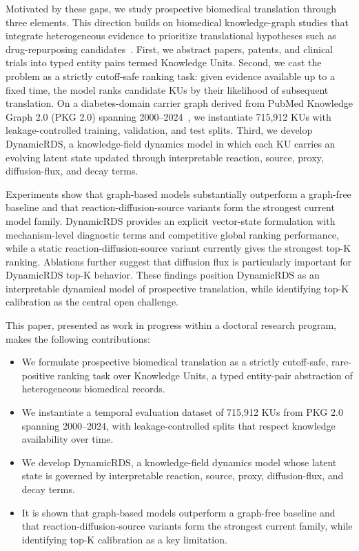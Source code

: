 \documentclass[conference]{IEEEtran}
\begin{document}
Motivated by these gaps, we study prospective biomedical translation through three elements. This direction builds on biomedical knowledge-graph studies that integrate heterogeneous evidence to prioritize translational hypotheses such as drug-repurposing candidates~\cite{himmelstein2017systematic}. First, we abstract papers, patents, and clinical trials into typed entity pairs termed Knowledge Units. Second, we cast the problem as a strictly cutoff-safe ranking task: given evidence available up to a fixed time, the model ranks candidate KUs by their likelihood of subsequent translation. On a diabetes-domain carrier graph derived from PubMed Knowledge Graph 2.0 (PKG 2.0) spanning 2000--2024~\cite{xu2024pubmed}, we instantiate 715,912 KUs with leakage-controlled training, validation, and test splits. Third, we develop DynamicRDS, a knowledge-field dynamics model in which each KU carries an evolving latent state updated through interpretable reaction, source, proxy, diffusion-flux, and decay terms.

Experiments show that graph-based models substantially outperform a graph-free baseline and that reaction-diffusion-source variants form the strongest current model family. DynamicRDS provides an explicit vector-state formulation with mechanism-level diagnostic terms and competitive global ranking performance, while a static reaction-diffusion-source variant currently gives the strongest top-K ranking. Ablations further suggest that diffusion flux is particularly important for DynamicRDS top-K behavior. These findings position DynamicRDS as an interpretable dynamical model of prospective translation, while identifying top-K calibration as the central open challenge.

This paper, presented as work in progress within a doctoral research program, makes the following contributions:

\begin{itemize}
\item We formulate prospective biomedical translation as a strictly cutoff-safe, rare-positive ranking task over Knowledge Units, a typed entity-pair abstraction of heterogeneous biomedical records.
\item We instantiate a temporal evaluation dataset of 715,912 KUs from PKG 2.0 spanning 2000--2024, with leakage-controlled splits that respect knowledge availability over time.
\item We develop DynamicRDS, a knowledge-field dynamics model whose latent state is governed by interpretable reaction, source, proxy, diffusion-flux, and decay terms.
\item It is shown that graph-based models outperform a graph-free baseline and that reaction-diffusion-source variants form the strongest current family, while identifying top-K calibration as a key limitation.
\end{itemize}
\end{document}
